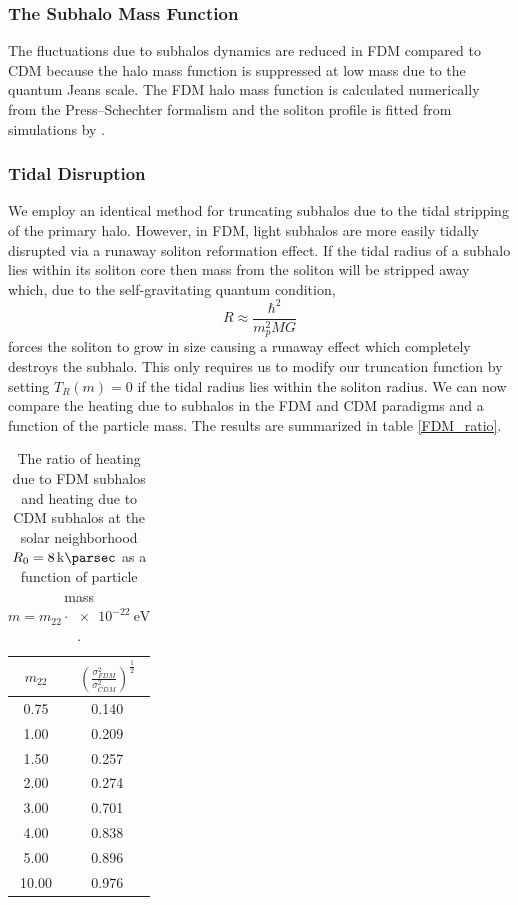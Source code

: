 \documentclass[usenatbib]{mnras}
\begin{document}
\subsubsection{The Subhalo Mass Function}

The fluctuations due to subhalos dynamics are reduced in FDM compared to CDM because the halo mass function is suppressed at low mass due to the quantum Jeans scale. The FDM halo mass function is calculated numerically from the Press--Schechter formalism \citep{substructure_FDM, marsh} and the soliton profile is fitted from simulations by \cite{schive_solitons}. 


\subsubsection{Tidal Disruption}

We employ an identical method for truncating subhalos due to the tidal stripping of the primary halo. However, in FDM, light subhalos are more easily tidally disrupted via a runaway soliton reformation effect. If the tidal radius of a subhalo lies within its soliton core then mass from the soliton will be stripped away which, due to the self-gravitating quantum condition,
\begin{equation}
R \approx \frac{\hbar^2}{m_p^2 M G}
\end{equation} 
forces the soliton to grow in size causing a runaway effect which completely destroys the subhalo. This only requires us to modify our truncation function by setting $T_R(m) = 0$ if the tidal radius lies within the soliton radius. We can now compare the heating due to subhalos in the FDM and CDM paradigms and a function of the particle mass. The results are summarized in table \eqref{FDM_ratio}.   

\begin{table} \label{FDM_ratio}
\begin{center}
 \begin{tabular}{||c c||} 
 \hline
 $m_{22}$ & $\left( \frac{\sigma_{FDM}^2}{\sigma_{CDM}^2} \right)^{\tfrac{1}{2}}$ \\ [2.5ex] 
 \hline\hline
 0.75 & 0.140 \\ 
 \hline
 1.00 & 0.209 \\
 \hline
 1.50 & 0.257 \\
 \hline
 2.00 & 0.274 \\
 \hline
 3.00 & 0.701 \\
 \hline
 4.00 & 0.838 \\
 \hline
 5.00 & 0.896 \\
 \hline
 10.00 & 0.976 \\ [1ex] 
 \hline
\end{tabular}
\end{center}
\caption{The ratio of heating due to FDM subhalos and heating due to CDM subhalos at the solar neighborhood $R_0 = \SI{8}{\kilo\parsec}$ as a function of particle mass $m = m_{22} \cdot \SI{e-22}{\electronvolt}$. }
\end{table}
\end{document}
